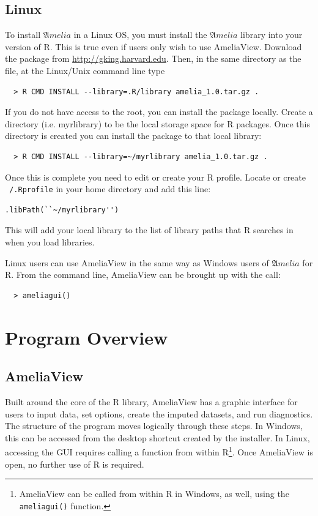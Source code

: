 \documentclass[12pt,titlepage]{article}
\newcommand{\Amelia}{\ensuremath{\mathfrak Amelia} }
\begin{document}
\subsection{Linux}
\label{sec:lin-install}
To install ${\mathfrak Amelia}$ in a Linux OS, you must install the
${\mathfrak Amelia}$ library into your version of R.  This is true
even if users only wish to use AmeliaView.  Download the package from
\url{http://gking.harvard.edu}.  Then, in the same directory as the
file, at the Linux/Unix command line type
  \begin{verbatim}
  > R CMD INSTALL --library=.R/library amelia_1.0.tar.gz .
  \end{verbatim}
If you do not have access to the root, you can install the package
locally.  Create a directory (i.e. myrlibrary) to be the local storage
space for R packages.  Once this directory is created you can install
the package to that local library:
  \begin{verbatim}
  > R CMD INSTALL --library=~/myrlibrary amelia_1.0.tar.gz .
  \end{verbatim}
Once this is complete you need to edit or create your R profile.
Locate or create \texttt{~/.Rprofile} in your home directory and add
this line:
\begin{verbatim}
.libPath(``~/myrlibrary'')
\end{verbatim}
This will add your local library to the list of library paths that R
searches in when you load libraries.

Linux users can use AmeliaView in the same way as Windows users of
\Amelia for R.  From the command line, AmeliaView can be brought up
with the call:
  \begin{verbatim}
  > ameliagui()
  \end{verbatim}




\section{Program Overview}
\label{sec:overview}

\subsection{AmeliaView}
\label{sec:guioverview}
Built around the core of the R library, AmeliaView has a graphic
interface for users to input data, set options, create the imputed
datasets, and run diagnostics.  The structure of the program moves
logically through these steps.  In Windows, this can be accessed from
the desktop shortcut created by the installer.  In Linux, accessing
the GUI requires calling a function from within R\footnote{AmeliaView
  can be called from within R in Windows, as well, using the
  \texttt{ameliagui()} function.}.  Once AmeliaView is open, no
further use of R is required.
\end{document}
